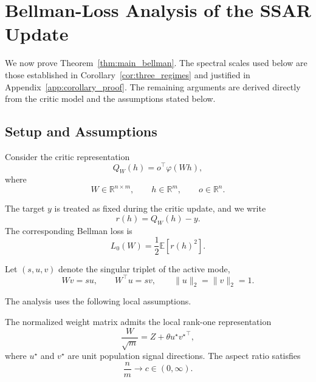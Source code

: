 
\section{Bellman-Loss Analysis of the SSAR Update}
\label{app:bellman_theory}

We now prove Theorem~\ref{thm:main_bellman}. The spectral scales used below
are those established in Corollary~\ref{cor:three_regimes} and justified in
Appendix~\ref{app:corollary_proof}. The remaining arguments are derived
directly from the critic model and the assumptions stated below.


\subsection{Setup and Assumptions}

Consider the critic representation
\begin{equation}
Q_W(h)
=
o^\top \varphi(Wh),
\end{equation}
where
\begin{equation}
W\in\mathbb{R}^{n\times m},
\qquad
h\in\mathbb{R}^{m},
\qquad
o\in\mathbb{R}^{n}.
\end{equation}

The target $y$ is treated as fixed during the critic update, and we write
\begin{equation}
r(h)
=
Q_W(h)-y.
\end{equation}
The corresponding Bellman loss is
\begin{equation}
L_0(W)
=
\frac{1}{2}
\mathbb{E}[r(h)^2].
\end{equation}

Let $(s,u,v)$ denote the singular triplet of the active mode,
\begin{equation}
Wv=su,
\qquad
W^\top u=sv,
\qquad
\|u\|_2=\|v\|_2=1.
\end{equation}

The analysis uses the following local assumptions.

\begin{assumption}
\label{ass:spiked}
The normalized weight matrix admits the local rank-one representation
\begin{equation}
\frac{W}{\sqrt m}
=
Z+\theta u^\star {v^\star}^{\top},
\end{equation}
where $u^\star$ and $v^\star$ are unit population signal directions.
The aspect ratio satisfies
\begin{equation}
\frac{n}{m}\rightarrow c\in(0,\infty).
\end{equation}
\end{assumption}

